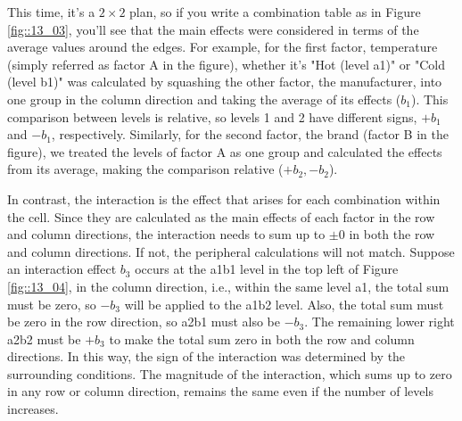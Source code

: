 \documentclass{ltjbook}
\begin{document}
This time, it's a $2\times2$ plan, so if you write a combination table as in Figure \ref{fig::13_03}, you'll see that the main effects were considered in terms of the average values around the edges. For example, for the first factor, temperature (simply referred as factor A in the figure), whether it's "Hot (level a1)" or "Cold (level b1)" was calculated by squashing the other factor, the manufacturer, into one group in the column direction and taking the average of its effects ($b_1$). This comparison between levels is relative, so levels 1 and 2 have different signs, $+b_1$ and $-b_1$, respectively. Similarly, for the second factor, the brand (factor B in the figure), we treated the levels of factor A as one group and calculated the effects from its average, making the comparison relative ($+b_2, -b_2$).

In contrast, the interaction is the effect that arises for each combination within the cell. Since they are calculated as the main effects of each factor in the row and column directions, the interaction needs to sum up to $\pm 0$ in both the row and column directions. If not, the peripheral calculations will not match. Suppose an interaction effect $b_3$ occurs at the a1b1 level in the top left of Figure \ref{fig::13_04}, in the column direction, i.e., within the same level a1, the total sum must be zero, so $-b_3$ will be applied to the a1b2 level. Also, the total sum must be zero in the row direction, so a2b1 must also be $-b_3$. The remaining lower right a2b2 must be $+b_3$ to make the total sum zero in both the row and column directions. In this way, the sign of the interaction was determined by the surrounding conditions. The magnitude of the interaction, which sums up to zero in any row or column direction, remains the same even if the number of levels increases.
\end{document}
